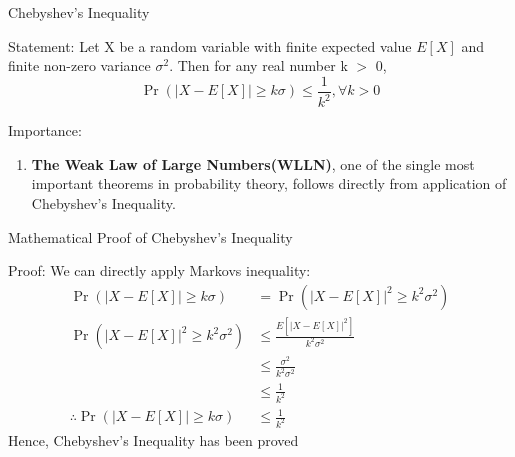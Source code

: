 \documentclass{beamer}
\providecommand{\pr}[1]{\ensuremath{\Pr\left(#1\right)}}
\begin{document}
\begin{frame}{Chebyshev's Inequality}
\begin{block}{Statement:}
      Let X be a random variable with finite expected value $E[X]$ and finite non-zero variance $\sigma^2$. Then for any real number k $>$ 0,
      \begin{equation}
      \label{chebyshev}
          \pr{\lvert X - E[X] \rvert \ge k\sigma} \le \frac{1}{k^{2}}, \forall k>0
      \end{equation}
\end{block}
\end{frame}
\begin{frame}
\begin{block}{Importance:}
\begin{enumerate}
    \item \textbf{The Weak Law of Large Numbers(WLLN)}, one of the single most important theorems in probability theory, follows directly from application of Chebyshev's Inequality. 
\end{enumerate}
\end{block}
\end{frame}
\begin{frame}{Mathematical Proof of Chebyshev's Inequality}
\begin{block}{Proof:}
  We can directly apply Markovs inequality: 
  \begin{align}
    \pr{\lvert X - E[X] \rvert \ge k\sigma} &=  \pr{\lvert X - E[X] \rvert^2 \ge k^2\sigma^2} \\
 \pr{\lvert X - E[X] \rvert^2 \ge k^2\sigma^2} &\le \frac{E[\lvert X - E[X] \rvert^2]}{k^2\sigma^2} \\
                                            &\le \frac{\sigma^2}{k^2 \sigma^2} \\
                                            &\le \frac{1}{k^2} \\
  \therefore  \pr{\lvert X - E[X] \rvert \ge k\sigma} &\le \frac{1}{k^2}                                        
  \end{align}
 \centering Hence, Chebyshev's Inequality has been proved
\end{block}
\end{frame}
\end{document}
